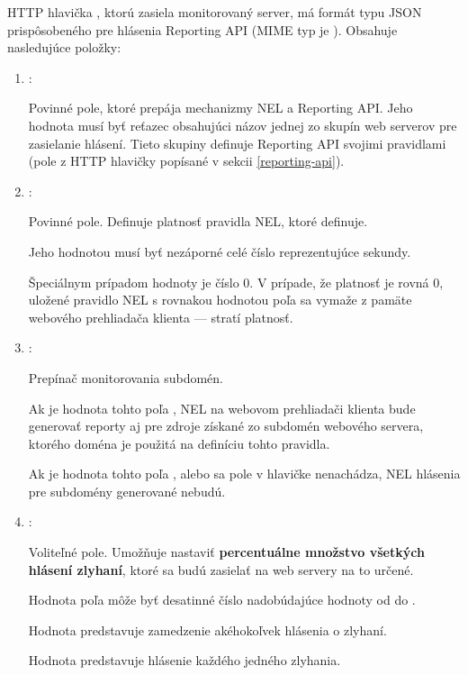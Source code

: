 HTTP hlavička , ktorú zasiela monitorovaný server, má formát typu JSON prispôsobeného pre hlásenia Reporting API (MIME typ je ).
Obsahuje nasledujúce položky:
\begin{enumerate}
    \item {}:

    Povinné pole, ktoré prepája mechanizmy NEL a Reporting API.
    Jeho hodnota musí byť reťazec obsahujúci názov jednej zo skupín web serverov pre zasielanie hlásení.
    Tieto skupiny definuje Reporting API svojimi pravidlami (pole  z HTTP hlavičky  popísané v sekcii \ref{reporting-api}).
    
    \item {}:

    Povinné pole.
    Definuje platnosť pravidla NEL, ktoré definuje.
    
    Jeho hodnotou musí byť nezáporné celé číslo reprezentujúce sekundy.

    Špeciálnym prípadom hodnoty je číslo 0.
    V prípade, že platnosť je rovná 0, uložené pravidlo NEL s rovnakou hodnotou poľa  sa vymaže z pamäte webového prehliadača klienta --- stratí platnosť. 
    
    \item {}:

    Prepínač monitorovania subdomén. 
    
    Ak je hodnota tohto poľa , NEL na webovom prehliadači klienta bude generovať reporty aj pre zdroje získané zo subdomén webového servera, ktorého doména 
    je použitá na definíciu tohto pravidla.
    
    Ak je hodnota tohto poľa , alebo sa pole v hlavičke nenachádza, NEL hlásenia pre subdomény generované nebudú.

    \item {}:

    Voliteľné pole. Umožňuje nastaviť \textbf{percentuálne množstvo všetkých hlásení zlyhaní}, ktoré sa budú zasielať na web servery na to určené.

    Hodnota poľa môže byť desatinné číslo nadobúdajúce hodnoty od  do .
    
    Hodnota  predstavuje zamedzenie akéhokoľvek hlásenia o zlyhaní. 
    
    Hodnota  predstavuje hlásenie každého jedného zlyhania.


\end{enumerate}
